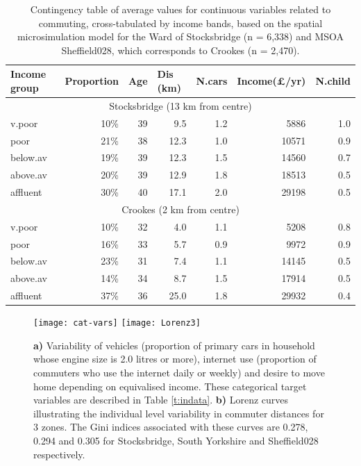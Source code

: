 \begin{table}[h*]
\caption[Commuting characteristics cross-tabulated by income bands]
{Contingency table of average values for continuous variables related to commuting,
cross-tabulated by income bands, based on the spatial microsimulation
model for the Ward of Stocksbridge (n = 6,338) and MSOA Sheffield028, which
corresponds to Crookes (n = 2,470).}
\begin{center}
\begin{tabular}{lrrrrrr}
\toprule
Income group & \multicolumn{1}{l}{Proportion} & \multicolumn{1}{l}{Age} &
\multicolumn{1}{l}{Dis (km)} & \multicolumn{1}{l}{N.cars} &
\multicolumn{1}{l}{Income(\pounds/yr)} & \multicolumn{1}{l}{N.child} \\ \midrule
\multicolumn{7}{c}{Stocksbridge (13 km from centre)} \\ \midrule
v.poor & 10\% & 39 & 9.5 & 1.2 & 5886 & 1.0 \\ 
poor & 21\% & 38 & 12.3 & 1.0 & 10571 & 0.9 \\ 
below.av & 19\% & 39 & 12.3 & 1.5 & 14560 & 0.7 \\ 
above.av & 20\% & 39 & 12.9 & 1.8 & 18513 & 0.5 \\ 
affluent & 30\% & 40 & 17.1 & 2.0 & 29198 & 0.5 \\ \midrule
\multicolumn{7}{c}{Crookes (2 km from centre)} \\ \midrule
v.poor &  10\% & 32 & 4.0 & 1.1 & 5208 & 0.8 \\ 
poor & 16\% & 33 & 5.7 & 0.9 & 9972 & 0.9 \\ 
below.av & 23\% & 31 & 7.4 & 1.1 & 14145 & 0.5 \\ 
above.av & 14\% & 34 & 8.7 & 1.5 & 17914 & 0.5 \\ 
affluent & 37\% & 36 & 25.0 & 1.8 & 29932 & 0.4 \\
\bottomrule
\end{tabular}             \end{center}
\label{t:msim-res2}
\end{table}

\begin{figure}[h*]
 \centering
\texttt{[image: cat-vars]}
\texttt{[image: Lorenz3]}
 \caption[a) Income and household traits; b) Lorenz curves of commute distances]
 {\textbf{a)} Variability of vehicles (proportion of primary cars in household
whose engine size is 2.0 litres or more), internet use (proportion of
commuters who use the internet daily or weekly) and desire to move home
depending on equivalised income. These categorical target variables are
described in Table \ref{t:indata}. \textbf{b)} Lorenz curves illustrating the
individual level variability in
commuter distances for 3 zones. The Gini indices associated with these curves
are 0.278, 0.294 and 0.305 for Stocksbridge, South Yorkshire and Sheffield028
respectively.}
 \label{fig:cat-vars}
\end{figure}

